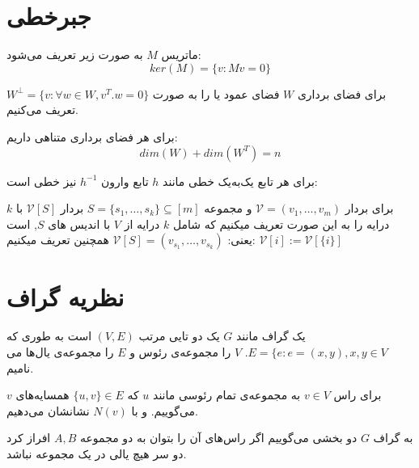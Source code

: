 \section{جبرخطی}
\begin{definition}[
	هسته
	]
	ماتریس
	$M$
	به صورت زیر تعریف می‌شود:
	$$ker(M) = \{v: Mv = 0\}$$
\end{definition}
برای فضای برداری
$W$
فضای عمود یا
 را به صورت
$W^\bot = \{v: \forall w \in W, v^T.w = 0\}$
تعریف می‌کنیم.

\begin{theorem}
	برای هر فضای برداری متناهی داریم:
	$$dim(W) + dim(W^T) = n$$
\end{theorem}
\begin{remark}
	برای هر تابع یک‌به‌یک خطی مانند
	$h$
	تابع وارون 
	$h^{-1}$
	نیز خطی است:
\end{remark}

برای بردار
$\mathcal{V} = (v_1, \ldots, v_m)$ 
و مجموعه
$S = \{s_1, \ldots, s_k\} \subseteq [m]$
بردار
$\mathcal{V} [S]$ 
با 
$k$
درایه را به این صورت تعریف میکنیم که شامل 
$k$ 
درایه از
$V$ 
با اندیس های
$S$, 
است یعنی:
$\mathcal{V} [S] = (v_{s_1}, \ldots, v_{s_k})$
همچنین تعریف میکنیم:
$\mathcal{V} [i] := \mathcal{V} [{\{i\}}]$

\section{نظریه گراف}
\begin{definition}
یک گراف مانند
$G$
یک دو تایی مرتب
$(V, E)$
است به طوری که
$E = \{e: e = (x, y), x, y \in V$.
 $V$
را مجموعه‌ی رئوس و
$E$
را مجموعه‌ی یال‌ها می نامیم.

برای راس
$v\in V$
به مجمو‌عه‌ی تمام رئوسی مانند
  $u$ 
  که
  $\{u,v\}\in E$ 
  همسایه‌های 
  $v$
  می‌گوییم.
  و با
  $N(v)$
  نشانشان می‌دهیم.
  
به گراف
$G$
دو بخشی می‌گوییم اگر راس‌های آن را بتوان به دو مجموعه 
$A, B$
افراز کرد دو سر هیچ یالی در یک مجموعه نباشد.
\end{definition}

